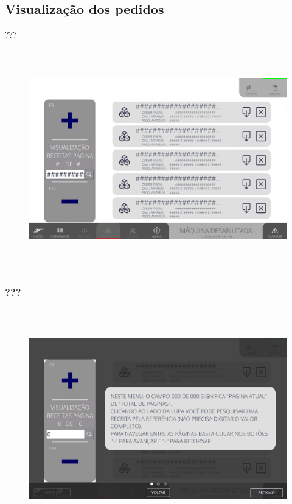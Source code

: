 \thispagestyle{fancy}
\vspace*{\fill}
\subsection{Visualização dos pedidos}
 ???
\begin{figure}[h]
  \centering
  \includegraphics[width=576px,height=360px]{src/imagesFlexo/10-orders/01-visualization/e-Tela-Principal.png}
   \label{}
\end{figure}

\newpage
\thispagestyle{fancy}
\vspace*{\fill}
\subsubsection{\small{???}}
\begin{figure}[h]
  \centering
  \includegraphics[width=576px,height=360px]{src/imagesFlexo/10-orders/01-visualization/e-1.png}
   \label{}
\end{figure}
\vspace*{\fill}

